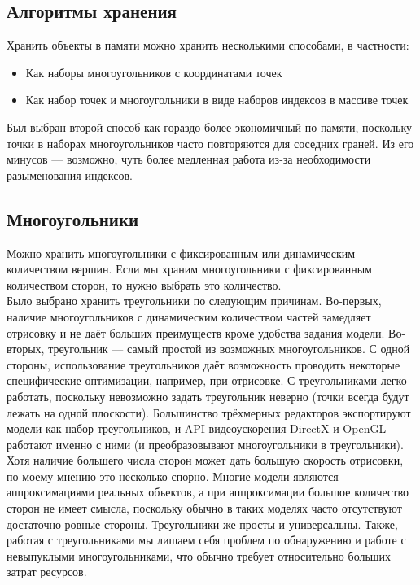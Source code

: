 \documentclass[a4paper,12pt]{report}
\begin{document}
\subsection{Алгоритмы хранения}
Хранить объекты в памяти можно хранить несколькими способами, в частности:
\begin{itemize}
\item Как наборы многоугольников с координатами точек
\item Как набор точек и многоугольники в виде наборов индексов в массиве точек
\end{itemize}
Был выбран второй способ как гораздо более экономичный по памяти, поскольку точки в наборах многоугольников часто повторяются для соседних граней. Из его минусов --- возможно, чуть более медленная работа из-за необходимости разыменования индексов.

\subsection{Многоугольники}
Можно хранить многоугольники с фиксированным или динамическим количеством вершин. Если мы храним многоугольники с фиксированным количеством сторон, то нужно выбрать это количество. \\
Было выбрано хранить треугольники по следующим причинам. Во-первых, наличие многоугольников с динамическим количеством частей замедляет отрисовку и не даёт больших преимуществ кроме удобства задания модели. Во-вторых, треугольник --- самый простой из возможных многоугольников. С одной стороны, использование треугольников даёт возможность проводить некоторые специфические оптимизации, например, при отрисовке. С треугольниками легко работать, поскольку невозможно задать треугольник неверно (точки всегда будут лежать на одной плоскости). Большинство трёхмерных редакторов экспортируют модели как набор треугольников, и API видеоускорения DirectX и OpenGL работают именно с ними (и преобразовывают многоугольники в треугольники). Хотя наличие большего числа сторон может дать большую скорость отрисовки, по моему мнению это несколько спорно. Многие модели являются аппроксимациями реальных объектов, а при аппроксимации большое количество сторон не имеет смысла, поскольку обычно в таких моделях часто отсутствуют достаточно ровные стороны. Треугольники же просты и универсальны. Также, работая с треугольниками мы лишаем себя проблем по обнаружению и работе с невыпуклыми многоугольниками, что обычно требует относительно больших затрат ресурсов.
\end{document}
